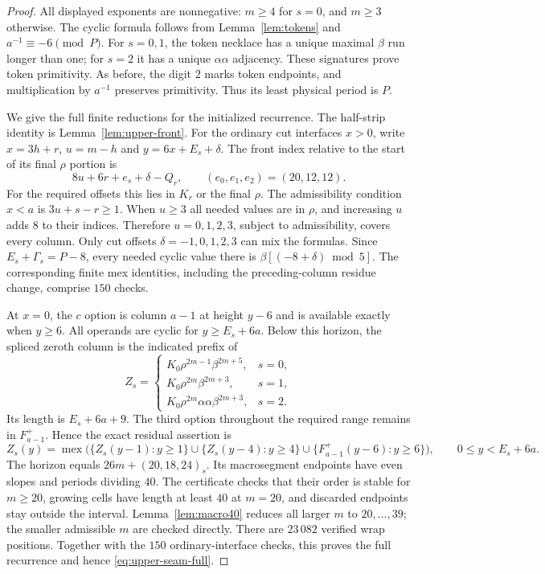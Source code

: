 \documentclass[11pt]{article}
\theoremstyle{remark}\newtheorem{remark}[theorem]{Remark}
\DeclareMathOperator{\mex}{mex}
\begin{document}
\begin{proof}
All displayed exponents are nonnegative: $m\ge4$ for $s=0$, and
$m\ge3$ otherwise.  The cyclic formula follows from
Lemma~\ref{lem:tokens} and $a^{-1}\equiv-6\pmod P$.
For $s=0,1$, the token necklace has a unique maximal $\beta$ run
longer than one; for $s=2$ it has a unique $\alpha\alpha$ adjacency.
These signatures prove token primitivity.  As before, the digit $2$
marks token endpoints, and multiplication by $a^{-1}$ preserves
primitivity.  Thus its least physical period is $P$.

We give the full finite reductions for the initialized recurrence.
The half-strip identity is Lemma~\ref{lem:upper-front}.  For the
ordinary cut interfaces $x>0$, write $x=3h+r$, $u=m-h$ and
$y=6x+E_s+\delta$.  The front index relative to the start of its
final $\rho$ portion is
\[
 8u+6r+e_s+\delta-Q_r,
 \qquad (e_0,e_1,e_2)=(20,12,12).
\]
For the required offsets this lies in $K_r$ or the final $\rho$.
The admissibility condition $x<a$ is $3u+s-r\ge1$.  When $u\ge3$
all needed values are in $\rho$, and increasing $u$ adds $8$ to
their indices.  Therefore $u=0,1,2,3$, subject to admissibility,
covers every column.  Only cut offsets $\delta=-1,0,1,2,3$ can mix
the formulas.  Since $E_s+\Gamma_s=P-8$, every needed cyclic value
there is $\beta[(-8+\delta)\bmod5]$.  The corresponding finite mex
identities, including the preceding-column residue change, comprise
$150$ checks.

At $x=0$, the $c$ option is column $a-1$ at height $y-6$ and is
available exactly when $y\ge6$.  All operands are cyclic for
$y\ge E_s+6a$.  Below this horizon, the spliced zeroth column is
the indicated prefix of
\[
 Z_s=
 \begin{cases}
 K_0\rho^{2m-1}\beta^{2m+5},&s=0,\\
 K_0\rho^{2m}\beta^{2m+3},&s=1,\\
 K_0\rho^{2m}\alpha\alpha\beta^{2m+3},&s=2.
 \end{cases}
\]
Its length is $E_s+6a+9$.  The third option throughout the required
range remains in $F^+_{a-1}$.  Hence the exact residual assertion is
\[
 Z_s(y)=\mex\bigl(
 \{Z_s(y-1):y\ge1\}\cup\{Z_s(y-4):y\ge4\}
 \cup\{F^+_{a-1}(y-6):y\ge6\}\bigr),
 \qquad 0\le y<E_s+6a.
\]
The horizon equals $26m+(20,18,24)_s$.  Its macrosegment endpoints
have even slopes and periods dividing $40$.  The certificate checks
that their order is stable for $m\ge20$, growing cells have length
at least $40$ at $m=20$, and discarded endpoints stay outside the
interval.  Lemma~\ref{lem:macro40} reduces all larger $m$ to
$20,\ldots,39$; the smaller admissible $m$ are checked directly.
There are $23\,082$ verified wrap positions.  Together with the
$150$ ordinary-interface checks, this proves the full recurrence
and hence \eqref{eq:upper-seam-full}.


\end{proof}
\end{document}
